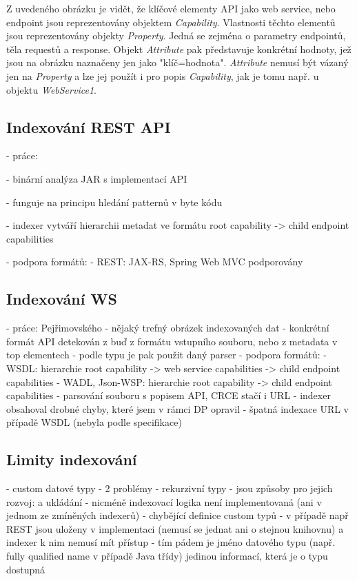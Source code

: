 \documentclass[czech,DP]{thesiskiv}
\begin{document}
Z uvedeného obrázku je vidět, že klíčové elementy API jako web service, nebo endpoint jsou reprezentovány objektem \textit{Capability}. Vlastnosti těchto elementů jsou reprezentovány objekty \textit{Property}. Jedná se zejména o parametry endpointů, těla requestů a response. Objekt \textit{Attribute} pak představuje konkrétní hodnoty, jež jsou na obrázku naznačeny jen jako "klíč=hodnota". \textit{Attribute} nemusí být vázaný jen na \textit{Property} a lze jej použít i pro popis \textit{Capability}, jak je tomu např. u objektu \textit{WebService1}.

\subsection{Indexování REST API}

- práce: \cite{hessova2015rest}

- binární analýza JAR s implementací API

- funguje na principu hledání patternů v byte kódu

- indexer vytváří hierarchii metadat ve formátu root capability -> child endpoint capabilities

- podpora formátů:
	- REST: JAX-RS, Spring Web MVC podporovány

\subsection{Indexování WS}

- práce: Pejřimovského \cite{pejrimovsky2015ws}
- nějaký trefný obrázek indexovaných dat
- konkrétní formát API detekován z buď z formátu vstupního souboru, nebo z metadata v top elementech
- podle typu je pak použit daný parser
- podpora formátů:
	- WSDL: hierarchie root capability -> web service capabilities -> child endpoint capabilities
	- WADL, Json-WSP: hierarchie root capability -> child endpoint capabilities
	- parsování souboru s popisem API, CRCE stačí i URL
- indexer obsahoval drobné chyby, které jsem v rámci DP opravil
	- špatná indexace URL v případě WSDL (nebyla podle specifikace)

\subsection{Limity indexování}

 - custom datové typy
 - 2 problémy
	- rekurzivní typy
		- jsou způsoby pro jejich rozvoj: \cite{abadi1995subytping} a ukládání
		- nicméně indexovací logika není implementovaná (ani v jednom ze zmíněných indexerů)
	- chybějící definice custom typů
		- v případě např REST jsou uloženy v implementaci (nemusí se jednat ani o stejnou knihovnu) a indexer k nim nemusí mít přístup
		- tím pádem je jméno datového typu (např. fully qualified name v případě Java třídy) jedinou informací, která je o typu dostupná
\end{document}
